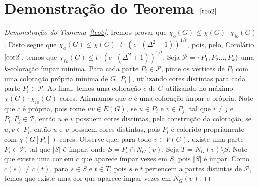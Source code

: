   \section{Demonstração do Teorema $\ref{teo2}$} \newl

\begin{proof}[Demonstração do Teorema~\ref{teo2}]
	Iremos provar que $\chi_{o}(G) \leq \chi(G) {\cdot} \chi_{io}(G)$. Disto segue que $\chi_{o}(G) \leq \chi(G) {\cdot} t {\cdot} (e {\cdot} (\Delta^2 + 1))^{1/t}$, pois, pelo, Corolário $\ref{cor2}$, temos que $ \chi_{io}(G) \leq t {\cdot} (e {\cdot} (\Delta^2 + 1))^{1/t}$. Seja $\mathcal{P} = \{P_1, P_2 \ldots, P_k\}$ uma $k$-coloração ímpar mínima. Para cada parte $P_i \in \mathcal{P}$, pinte os vértices de $P_i$ com uma coloração própria mínima de $G[P_i]$, utilizando cores distintas para cada parte $P_i \in \mathcal{P}$. Ao final, temos uma coloração $c$ de $G$ utilizando no máximo $\chi(G) {\cdot} \chi_{io}(G)$ cores. Afirmamos que $c$ é uma coloração ímpar e própria. Note que $c$ é própria, pois tome $uv \in E(G)$, se $u \in P_i$ e $v \in P_j$, tal que $i \neq j$ e $P_i, P_j \in \mathcal{P}$, então $u$ e $v$ possuem cores distintas, pela construção da coloração, se $u, v \in P_i$, então $u$ e $v$ possuem cores distintas, pois $P_i$ é colorido propriamente com $\chi(G[P_i])$ cores. Observe que, para todo $v \in V(G)$, existe uma parte $P_i \in \mathcal{P}$, tal que $|S|$ é ímpar, onde $S = P_i \cap N_G(v)$. Seja $T = N_G(v) \setminus S$. Note que existe uma cor em $c$ que aparece ímpar vezes em $S$, pois $|S|$ é ímpar. Como $c(s) \neq c(t)$, para $s \in S$ e $t \in T$, pois $s$ e $t$ pertencem a partes distintas de $\mathcal{P}$, temos que existe uma cor que aparece ímpar vezes em $N_G(v)$. 
	
\end{proof}